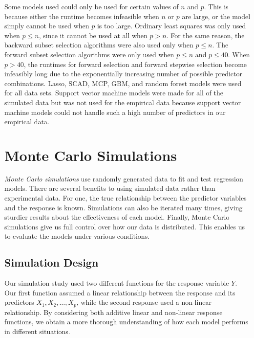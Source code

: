\documentclass[final,onefignum,onetabnum]{siuro210301}
\begin{document}
	Some models used could only be used for certain values of $n$ and $p$. This is because either the runtime becomes infeasible when $n$ or $p$ are large, or the model simply cannot be used when $p$ is too large. Ordinary least squares was only used when $p\leq n$, since it cannot be used at all when $p>n$. For the same reason, the backward subset selection algorithms were also used only when $p\leq n$. The forward subset selection algorithms were only used when $p\leq n$ and $p\leq 40$. When $p>40$, the runtimes for forward selection and forward stepwise selection become infeasibly long due to the exponentially increasing number of possible predictor combinations. Lasso, SCAD, MCP, GBM, and random forest models were used for all data sets. Support vector machine models were made for all of the simulated data but was not used for the empirical data because support vector machine models could not handle such a high number of predictors in our empirical data.
	
	\section{Monte Carlo Simulations}\label{sec:simulations}
	
	\textit{Monte Carlo simulations} use randomly generated data to fit and test regression  models. There are several benefits to using simulated data rather than experimental data. For one, the true relationship between the predictor variables and the response is known. Simulations can also be iterated many times, giving sturdier results about the effectiveness of each model. Finally, Monte Carlo simulations give us full control over how our data is distributed. This enables us to evaluate the models under various conditions.
	
	
	\subsection{Simulation Design}
	
	Our simulation study used two different functions for the response variable $Y$. Our first function assumed a linear relationship between the response and its predictors $X_1, X_2, \dotsc, X_p$, while the second response used a non-linear relationship. By considering both additive linear and non-linear response functions, we obtain a more thorough understanding of how each model performs in different situations.
	
\end{document}
